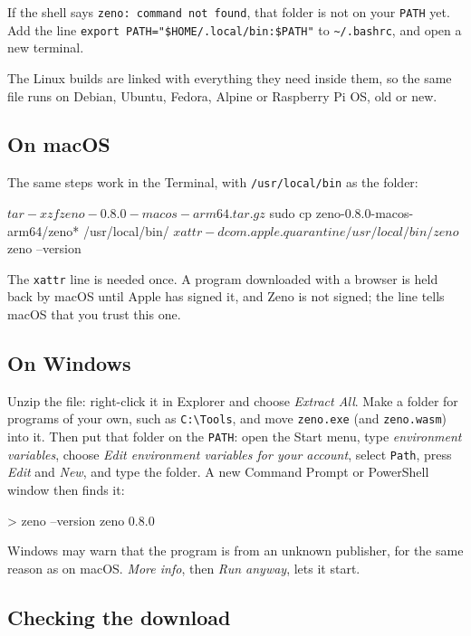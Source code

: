 If the shell says \verb|zeno: command not found|, that folder is not on
your \verb|PATH| yet. Add the line \verb|export PATH="$HOME/.local/bin:$PATH"|
to \verb|~/.bashrc|, and open a new terminal.

The Linux builds are linked with everything they need inside them, so
the same file runs on Debian, Ubuntu, Fedora, Alpine or Raspberry Pi
OS, old or new.

\subsection{On macOS}

The same steps work in the Terminal, with \verb|/usr/local/bin| as the
folder:

\begin{zenofrag}[lang=shell]
$ tar -xzf zeno-0.8.0-macos-arm64.tar.gz
$ sudo cp zeno-0.8.0-macos-arm64/zeno* /usr/local/bin/
$ xattr -d com.apple.quarantine /usr/local/bin/zeno
$ zeno --version
\end{zenofrag}

The \verb|xattr| line is needed once. A program downloaded with a
browser is held back by macOS until Apple has signed it, and Zeno is
not signed; the line tells macOS that you trust this one.

\subsection{On Windows}

Unzip the file: right-click it in Explorer and choose
\emph{Extract All}. Make a folder for programs of your own, such as
\verb|C:\Tools|, and move \verb|zeno.exe| (and \verb|zeno.wasm|) into
it. Then put that folder on the \verb|PATH|: open the Start menu, type
\emph{environment variables}, choose \emph{Edit environment variables
for your account}, select \verb|Path|, press \emph{Edit} and
\emph{New}, and type the folder. A new Command Prompt or PowerShell
window then finds it:

\begin{zenofrag}[lang=shell]
> zeno --version
zeno 0.8.0
\end{zenofrag}

Windows may warn that the program is from an unknown publisher, for
the same reason as on macOS. \emph{More info}, then \emph{Run anyway},
lets it start.

\subsection{Checking the download}

